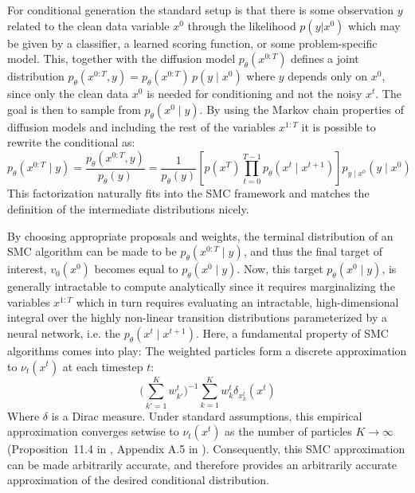 For conditional generation the standard setup is that there is some observation $y$ related to the clean data variable $x^0$ through the likelihood $p(y | x^0)$ which may be given by a classifier, a learned scoring function, or some problem-specific model. This, together with the diffusion model $p_{\theta}(x^{0:T})$ defines a joint distribution $p_\theta(x^{0:T}, y) = p_\theta(x^{0:T}) \, p(y \mid x^0)$ where $y$ depends only on $x^0$, since only the clean data $x^0$ is needed for conditioning and not the noisy $x^t$. The goal is then to sample from $p_\theta(x^0 \mid y)$. By using the Markov chain properties of diffusion models and including the rest of the variables $x^{1:T}$ it is possible to rewrite the conditional as:
\begin{equation}
p_\theta(x^{0:T} \mid y)
= \frac{p_\theta(x^{0:T}, y)}{p_\theta(y)}
= \frac{1}{p_\theta(y)} \left[ p(x^T) \prod_{t=0}^{T-1} p_\theta(x^t \mid x^{t+1}) \right] p_{y \mid x^0}(y \mid x^0)
\label{eq:conditional_markov}
\end{equation}
This factorization naturally fits into the SMC framework and matches the definition of the intermediate distributions nicely.

By choosing appropriate proposals and weights, the terminal distribution of an SMC algorithm can be made to be $p_\theta(x^{0:T} \mid y)$, and thus the final target of interest, $v_0(x^0)$ becomes equal to $p_\theta(x^0 \mid y)$. Now, this target $p_\theta(x^0 \mid y)$, is generally intractable to compute analytically since it requires marginalizing the variables $x^{1:T}$ which in turn requires evaluating an intractable, high-dimensional integral over the highly non-linear transition distributions parameterized by a neural network, i.e. the $p_\theta(x^t \mid x^{t+1})$. Here, a fundamental property of SMC algorithms comes into play:
The weighted particles form a discrete approximation to $\nu_t(x^{t})$ at each timestep $t$:
\begin{equation}
	\bigg(\sum_{k'=1}^K w_{k'}^t\bigg)^{-1} \sum_{k=1}^K w_k^t \delta_{x_k^t}(x^t) %
\end{equation}
Where $\delta$ is a Dirac measure. Under standard assumptions, this empirical approximation converges setwise  to $\nu_t(x^t)$ as the number of particles $K \to \infty$ (Proposition~11.4 in \cite{chopin2020introduction}, Appendix A.5 in \cite{wu2024practicalasymptoticallyexactconditional}). Consequently, this SMC approximation can be made arbitrarily accurate, and therefore provides an arbitrarily accurate approximation of the desired conditional distribution.

